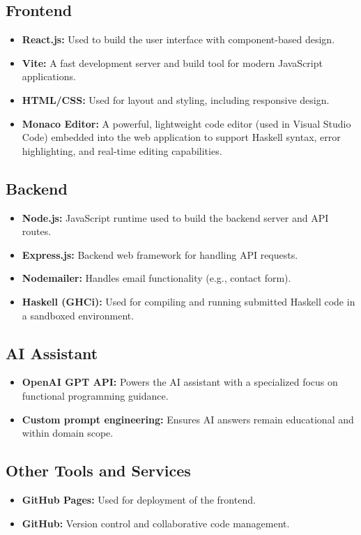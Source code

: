 \subsection{Frontend}

\begin{itemize}
  \item \textbf{React.js:} Used to build the user interface with component-based design.
  \item \textbf{Vite:} A fast development server and build tool for modern JavaScript applications.
  \item \textbf{HTML/CSS:} Used for layout and styling, including responsive design.
  \item \textbf{Monaco Editor:} A powerful, lightweight code editor (used in Visual Studio Code) embedded into the web application to support Haskell syntax, error highlighting, and real-time editing capabilities.
\end{itemize}

\subsection{Backend}

\begin{itemize}
  \item \textbf{Node.js:} JavaScript runtime used to build the backend server and API routes.
  \item \textbf{Express.js:} Backend web framework for handling API requests.
  \item \textbf{Nodemailer:} Handles email functionality (e.g., contact form).
  \item \textbf{Haskell (GHCi):} Used for compiling and running submitted Haskell code in a sandboxed environment.
\end{itemize}

\subsection{AI Assistant}

\begin{itemize}
  \item \textbf{OpenAI GPT API:} Powers the AI assistant with a specialized focus on functional programming guidance.
  \item \textbf{Custom prompt engineering:} Ensures AI answers remain educational and within domain scope.
\end{itemize}

\subsection{Other Tools and Services}

\begin{itemize}
  \item \textbf{GitHub Pages:} Used for deployment of the frontend.
  \item \textbf{GitHub:} Version control and collaborative code management.
\end{itemize}
